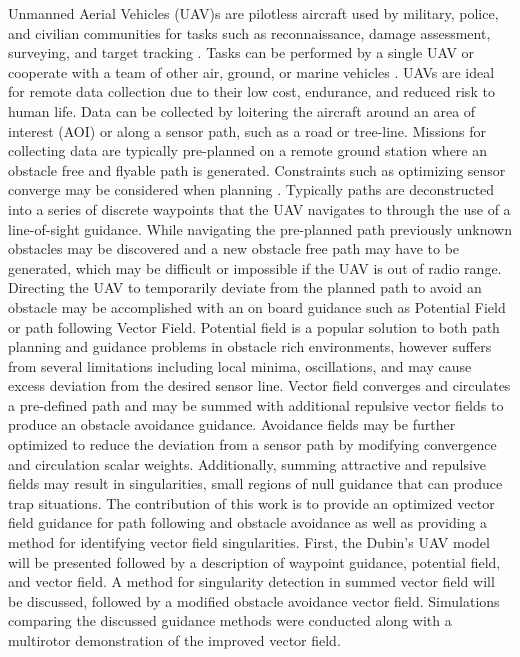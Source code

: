\documentclass[conf]{new-aiaa}
\begin{document}
Unmanned Aerial Vehicles (UAV)s are pilotless aircraft used by military, police, and civilian communities for tasks such as reconnaissance, damage assessment, surveying, and target tracking \cite{ariyur_autonomous_2008,teuliere_chasing_2011}. Tasks can be performed by a single UAV or cooperate with a team of other air, ground, or marine vehicles \cite{oh_coordinated_2013,hyondong_oh_coordinated_2015,ulun_coordinated_2013}. UAVs are ideal for remote data collection due to their low cost, endurance, and reduced risk to human life. Data can be collected by loitering the aircraft around an area of interest (AOI) or along a sensor path, such as a road or tree-line. Missions for collecting data are typically pre-planned on a remote ground station where an obstacle free and flyable path is generated. Constraints such as optimizing sensor converge may be considered when planning \cite{wilhelm_direct_2017}. Typically paths are deconstructed into a series of discrete waypoints that the UAV navigates to through the use of a line-of-sight guidance. While navigating the pre-planned path previously unknown obstacles may be discovered and a new obstacle free path may have to be generated, which may be difficult or impossible if the UAV is out of radio range. Directing the UAV to temporarily deviate from the planned path to avoid an obstacle may be accomplished with an on board guidance such as Potential Field or path following Vector Field. Potential field is a popular solution to both path planning and guidance problems in obstacle rich environments, however suffers from several limitations including local minima, oscillations, and may cause excess deviation from the desired sensor line. Vector field converges and circulates a pre-defined path and may be summed with additional repulsive vector fields to produce an obstacle avoidance guidance. Avoidance fields may be further optimized to reduce the deviation from a sensor path by modifying convergence and circulation scalar weights. Additionally, summing attractive and repulsive fields may result in singularities, small regions of null guidance that can produce trap situations. The contribution of this work is to provide an optimized vector field guidance for path following and obstacle avoidance as well as providing a method for identifying vector field singularities. First, the Dubin's UAV model will be presented followed by a description of waypoint guidance, potential field, and vector field. A method for singularity detection in summed vector field will be discussed, followed by a modified obstacle avoidance vector field. Simulations comparing the discussed guidance methods were conducted along with a multirotor demonstration of the improved vector field. 
\end{document}
